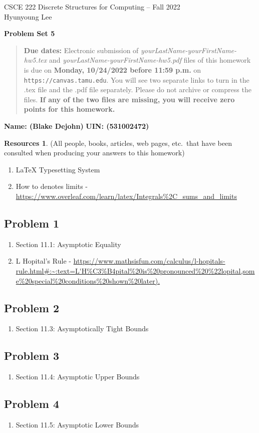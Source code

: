 \documentclass{article}
\theoremstyle{definition}
\newtheorem*{resources}{Resources}
\newcommand{\name}[2]{\noindent\textbf{Name: #1}\hfill \textbf{UIN: #2}
  \newcommand{\myName}{#1}
  \newcommand{\myUIN}{#2}
}
\newcommand{\problemset}[1]{\begin{center}\textbf{Problem Set #1}\end{center}}
\newcommand{\duedate}[1]{\begin{quote}\textbf{Due dates:} Electronic
    submission of \textsl{yourLastName-yourFirstName-hw5.tex} and 
    \textsl{yourLastName-yourFirstName-hw5.pdf} files of this homework is due on
    \textbf{#1} on \texttt{https://canvas.tamu.edu}. You will see two separate links
    to turn in the .tex file and the .pdf file separately. Please do not archive or compress the files.  
    \textbf{If any of the two files are missing, you will receive zero points for this homework.}\end{quote} }
\begin{document}
\begin{center}
{\large
CSCE 222 Discrete Structures for Computing -- Fall 2022\\[.5ex]
Hyunyoung Lee\\}
\end{center}
\problemset{5}
\duedate{Monday, 10/24/2022 before 11:59 p.m.}
\name{ (Blake Dejohn) }{ (531002472) } %
\begin{resources} (All people, books, articles, web pages, etc.\ that
  have been consulted when producing your answers to this homework)
\begin{enumerate}
\subsection*{Resources Overall (used for the whole document)}
\item LaTeX Typesetting System
\item How to denotes limits - \url{https://www.overleaf.com/learn/latex/Integrals%2C_sums_and_limits}
\end{enumerate}
\subsection*{Problem 1}
\begin{enumerate}
\item Section 11.1: Asymptotic Equality
\item L Hopital's Rule - \url{https://www.mathsisfun.com/calculus/l-hopitals-rule.html#:~:text=L'H%C3%B4pital%20is%20pronounced%20%22lopital,some%20special%20conditions%20shown%20later).}
\end{enumerate}
\subsection*{Problem 2}
\begin{enumerate}
\item Section 11.3: Asymptotically Tight Bounds
\end{enumerate}
\subsection*{Problem 3}
\begin{enumerate}
\item Section 11.4: Asymptotic Upper Bounds
\end{enumerate}
\subsection*{Problem 4}
\begin{enumerate}
\item Section 11.5: Asymptotic Lower Bounds
\end{enumerate}

\end{resources}
\end{document}
